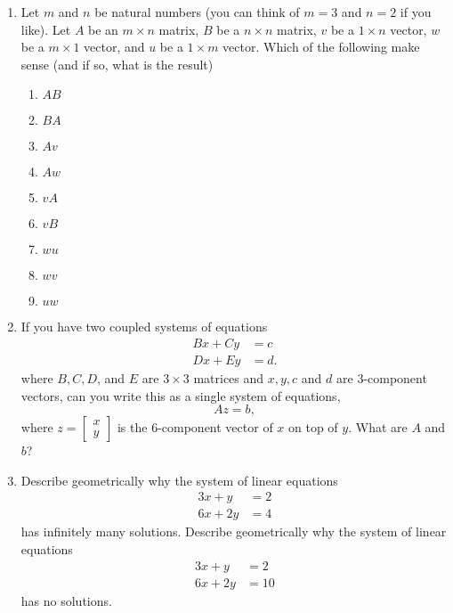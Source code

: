 \documentclass[11pt]{article}
\begin{document}
\begin{enumerate}

\item Let $m$ and $n$ be natural numbers (you can think of $m=3$ and $n=2$ if you like).  Let $A$ be an $m \times n$ matrix, $B$ be a $n \times n$ matrix, $v$ be a $1 \times n$ vector, $w$ be a $m \times 1$ vector, and $u$ be a $1 \times m$ vector.  Which of the following make sense (and if so, what is the result)

\begin{enumerate}

\item $A B$

\item $BA$

\item $A v$

\item $A w$

\item $ v A$

\item $v B$

\item $wu$

\item $w v$

\item $u w$

\end{enumerate}

\item If you have two coupled systems of equations
\begin{align*}
Bx + Cy &= c \\
Dx + Ey &= d.
\end{align*}
where $B, C, D$, and $E$ are $3 \times 3$ matrices and $x,y,c$ and $d$ are $3$-component vectors, can you write this as a single system of equations,
\[Az = b, \]
where $z = \begin{bmatrix} x \\ y \end{bmatrix}$ is the $6$-component vector of $x$ on top of $y$.  What are $A$ and $b$?

\item Describe geometrically why the system of linear equations
\begin{align*}
3x + y &= 2\\
6x + 2y &= 4
\end{align*}
has infinitely many solutions.  Describe geometrically why the system of linear equations
\begin{align*}
3x + y &= 2\\
6x + 2y &= 10
\end{align*}
has no solutions.


\end{enumerate}
\end{document}
